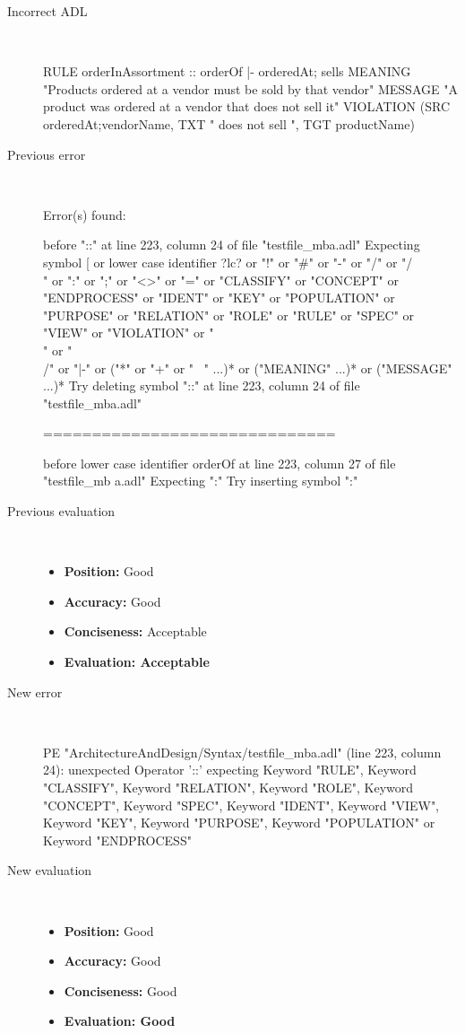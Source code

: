 \begin{description}
  \item[Incorrect ADL]~\\
\begin{adl}
RULE orderInAssortment :: orderOf |- orderedAt; sells 
MEANING "Products ordered at a vendor must be sold by that vendor"
MESSAGE "A product was ordered at a vendor that does not sell it"
VIOLATION (SRC orderedAt;vendorName, TXT " does not sell ", TGT productName)\end{adl}
  \item[Previous error]~\\
\begin{haskell}
Error(s) found:

before "::" at line 223, column 24 of file "testfile_mba.adl"
Expecting symbol [ or lower case identifier ?lc? or "!" or "#" or "-" or "/" or
"/\\" or ":" or ";" or "<>" or "=" or "CLASSIFY" or "CONCEPT" or "ENDPROCESS" or
 "IDENT" or "KEY" or "POPULATION" or "PURPOSE" or "RELATION" or "ROLE" or "RULE"
 or "SPEC" or "VIEW" or "VIOLATION" or "\\" or "\\/" or "|-" or ("*" or "+" or "
~" ...)* or ("MEANING" ...)* or ("MESSAGE" ...)*
Try deleting symbol "::" at line 223, column 24 of file "testfile_mba.adl"

==============================

before lower case identifier orderOf at line 223, column 27 of file "testfile_mb
a.adl"
Expecting ":"
Try inserting symbol ":"\end{haskell}
  \item[Previous evaluation]~\\
    \begin{itemize}
    \item \textbf{Position:} Good
    \item \textbf{Accuracy:} Good
    \item \textbf{Conciseness:} Acceptable
    \item \textbf{Evaluation: Acceptable}
    \end{itemize}
  \item[New error]~\\
\begin{haskell}
PE "ArchitectureAndDesign/Syntax/testfile_mba.adl" (line 223, column 24):
unexpected Operator '::'
expecting Keyword "RULE", Keyword "CLASSIFY", Keyword "RELATION", Keyword "ROLE", Keyword "CONCEPT", Keyword "SPEC", Keyword "IDENT", Keyword "VIEW", Keyword "KEY", Keyword "PURPOSE", Keyword "POPULATION" or Keyword "ENDPROCESS"\end{haskell}
  \item[New evaluation]~\\
    \begin{itemize}
    \item \textbf{Position:} Good
    \item \textbf{Accuracy:} Good
    \item \textbf{Conciseness:} Good
    \item \textbf{Evaluation: Good}
    \end{itemize}
  \end{description}

